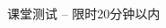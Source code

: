 \documentclass[xcolor=svgnames]{beamer}
\begin{document}
\begin{CJK*}{UTF8}{gbsn}


\begin{frame}{课堂测试 -- 限时20分钟以内}
\lstset{language=C, frame=trbl}%

\end{frame}


\end{CJK*}
\end{document}
